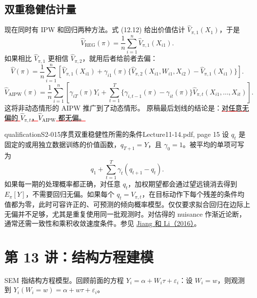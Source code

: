 \subsection{双重稳健估计量}
现在同时有 IPW 和回归两种方法。式 (12.12) 给出价值估计 $\widehat V_{\pi,1}(X_1)$，于是
\[
 \widehat V_{\mathrm{REG}}(\pi)=\frac1n\sum_{i=1}^n\widehat V_{\pi,1}(X_{i1}).
\]
如果相比 $\widehat V_{\pi,1}$ 更相信 $\widehat V_{\pi,2}$，就用后者给前者去偏：
\[
 \widehat V(\pi)=\frac1n\sum_{i=1}^n\left[
 \widehat V_{\pi,1}(X_{i1})+
 \gamma_{i1}(\pi)\{
 \widehat V_{\pi,2}(X_{i1},W_{i1},X_{i2})
 -\widehat V_{\pi,1}(X_{i1})\}\right].
\]
\[
 \widehat V_{\mathrm{AIPW}}(\pi)
 =\frac1n\sum_{i=1}^n\left[
 \gamma_{iT}(\pi)Y_i+
 \sum_{t=1}^T\{\gamma_{i,t-1}(\pi)-\gamma_{it}(\pi)\}
 \widehat V_{\pi,t}(X_{i1},\ldots,X_{it})\right].
\]
这将非动态情形的 AIPW 推广到了动态情形。
原稿最后划线的结论是：\textcolor{red}{\underline{\textcolor{black}{对任意无偏的 $\widehat V_{\pi,t}$，$\widehat V_{\mathrm{AIPW}}$ 都无偏。}}}
\begin{reviewnote}{qualification}{S2-015}{序贯双重稳健性所需的条件}{Lecture11-14.pdf, page 15}
设 $q_t$ 是固定的或用独立数据训练的价值函数，$q_{T+1}=Y$，且 $\gamma_0=1$。被平均的单项可写为
\[
 q_1+\sum_{t=1}^T\gamma_t(q_{t+1}-q_t).
\]
如果每一期的处理概率都正确，对任意 $q_t$，加权期望都会通过望远镜消去得到 $E_\pi[Y]$，不需要回归无偏。如果每个 $q_t=V_{\pi,t}$，在目标动作下每个残差的条件均值都为零，此时可容许正的、可预测的倾向概率模型。仅仅要求拟合回归在边际上无偏并不足够，尤其是重复使用同一批观测时。对估得的 nuisance 作渐近论断，通常还需一致性和乘积收敛速度条件。参见 \href{https://proceedings.mlr.press/v48/jiang16.html}{Jiang 和 Li（2016）}。
\end{reviewnote}


\section{第 13 讲：结构方程建模}
SEM 指结构方程模型。回顾前面的方程 $Y_i=\alpha+W_i\tau+\varepsilon_i$：设 $W_i=w$，则观测到 $Y_i(W_i=w)=\alpha+w\tau+\varepsilon_i$。

